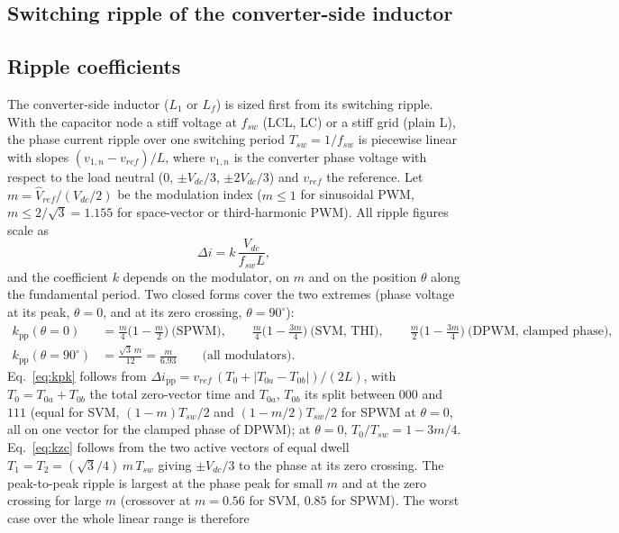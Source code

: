 \documentclass[10pt,a4paper]{scrartcl}
\newcommand{\Vdc}{V_{dc}}
\newcommand{\fsw}{f_{sw}}
\newcommand{\Lf}{L_{f}}
\newcommand{\pp}{\mathrm{pp}}
\begin{document}
\begin{onehalfspace}
\section{Switching ripple of the converter-side inductor}
\label{sec:ripple}
\subsection{Ripple coefficients}
The converter-side inductor ($L_1$ or $\Lf$) is sized first from its switching ripple. With the capacitor node a stiff voltage at $\fsw$ (LCL, LC) or a stiff grid (plain L), the phase current ripple over one switching period $T_{sw} = 1/\fsw$ is piecewise linear with slopes $(v_{1,n} - v_{ref})/L$, where $v_{1,n}$ is the converter phase voltage with respect to the load neutral ($0$, $\pm\Vdc/3$, $\pm 2\Vdc/3$) and $v_{ref}$ the reference. Let $m = \hat V_{ref}/(\Vdc/2)$ be the modulation index ($m \le 1$ for sinusoidal PWM, $m \le 2/\sqrt3 = 1.155$ for space-vector or third-harmonic PWM). All ripple figures scale as
\begin{equation}
\Delta i = k\,\frac{\Vdc}{\fsw L},
\label{eq:kdef}
\end{equation}
and the coefficient $k$ depends on the modulator, on $m$ and on the position $\theta$ along the fundamental period. Two closed forms cover the two extremes (phase voltage at its peak, $\theta = 0$, and at its zero crossing, $\theta = 90^\circ$):
{\small
\begin{align}
k_{\pp}(\theta = 0) &= \frac{m}{4}\Big(1 - \frac{m}{2}\Big)\ \text{(SPWM)},\qquad
\frac{m}{4}\Big(1 - \frac{3m}{4}\Big)\ \text{(SVM, THI)},\qquad
\frac{m}{2}\Big(1 - \frac{3m}{4}\Big)\ \text{(DPWM, clamped phase)},
\label{eq:kpk}\\
k_{\pp}(\theta = 90^\circ) &= \frac{\sqrt3\,m}{12} = \frac{m}{6.93}\qquad \text{(all modulators)}.
\label{eq:kzc}
\end{align}}
Eq.~\eqref{eq:kpk} follows from $\Delta i_{\pp} = v_{ref}\,(T_0 + |T_{0a} - T_{0b}|)/(2L)$, with $T_0 = T_{0a} + T_{0b}$ the total zero-vector time and $T_{0a}$, $T_{0b}$ its split between $000$ and $111$ (equal for SVM, $(1-m)T_{sw}/2$ and $(1-m/2)T_{sw}/2$ for SPWM at $\theta = 0$, all on one vector for the clamped phase of DPWM); at $\theta = 0$, $T_0/T_{sw} = 1 - 3m/4$. Eq.~\eqref{eq:kzc} follows from the two active vectors of equal dwell $T_1 = T_2 = (\sqrt3/4)\,m\,T_{sw}$ giving $\pm\Vdc/3$ to the phase at its zero crossing. The peak-to-peak ripple is largest at the phase peak for small $m$ and at the zero crossing for large $m$ (crossover at $m = 0.56$ for SVM, $0.85$ for SPWM). The worst case over the whole linear range is therefore

\end{onehalfspace}
\end{document}
